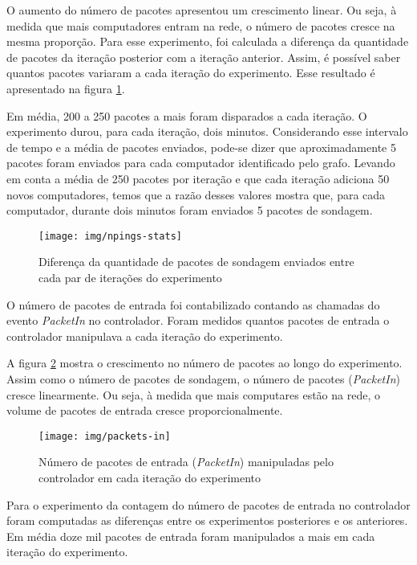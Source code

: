 O aumento do número de pacotes apresentou um crescimento linear.
Ou seja, à medida que mais computadores entram na rede, o número de pacotes
cresce na mesma proporção.
Para esse experimento, foi calculada a diferença da quantidade de pacotes da
iteração posterior com a iteração anterior.
Assim, é possível saber quantos pacotes variaram a cada iteração do
experimento.
Esse resultado é apresentado na figura \ref{fig:npings-stats}.

Em média, 200 a 250 pacotes a mais foram disparados a cada iteração.
O experimento durou, para cada iteração, dois minutos.
Considerando esse intervalo de tempo e a média de pacotes enviados, pode-se
dizer que aproximadamente 5 pacotes foram enviados para cada computador
identificado pelo grafo.
Levando em conta a média de 250 pacotes por iteração e que cada iteração
adiciona 50 novos computadores, temos que a razão desses valores mostra
que, para cada computador, durante dois minutos foram enviados 5 pacotes
de sondagem.

\begin{figure}[!htb]
    \centering
    \label{fig:npings-stats}
    \texttt{[image: img/npings-stats]}
    \caption{Diferença da quantidade de pacotes de sondagem enviados entre
    cada par de iterações do experimento}
\end{figure}

O número de pacotes de entrada foi contabilizado contando as chamadas do
evento \emph{PacketIn} no controlador.
Foram medidos quantos pacotes de entrada o controlador manipulava a cada
iteração do experimento.

A figura \ref{fig:packets-in} mostra o crescimento no número de pacotes ao
longo do experimento.
Assim como o número de pacotes de sondagem, o número de pacotes
(\emph{PacketIn}) cresce linearmente.
Ou seja, à medida que mais computares estão na rede, o volume de pacotes de
entrada cresce proporcionalmente.

\begin{figure}[!htb]
    \centering
    \label{fig:packets-in}
    \texttt{[image: img/packets-in]}
    \caption{Número de pacotes de entrada (\emph{PacketIn}) manipuladas pelo
    controlador em cada iteração do experimento}
\end{figure}


Para o experimento da contagem do número de pacotes de entrada no controlador
foram computadas as diferenças entre os experimentos posteriores e os
anteriores.
Em média doze mil pacotes de entrada foram manipulados a mais em cada
iteração do experimento.

